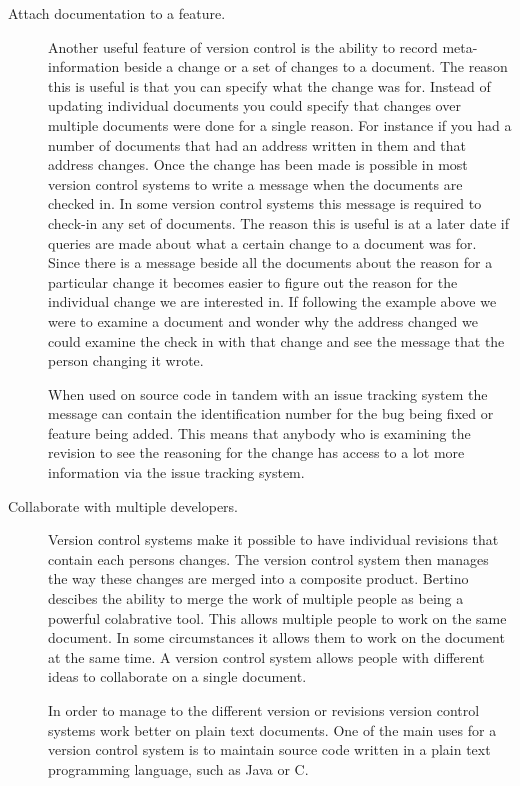 \begin{description}
  \item [Attach documentation to a feature.]    
  Another useful feature of version control is the ability to record meta-information beside a change or a set of changes to a document.  The reason this is useful is that you can specify what the change was for.  Instead of updating individual documents you could specify that changes over multiple documents were done for a single reason.  For instance if you had a number of documents that had an address written in them and that address changes.  Once the change has been made is possible in most version control systems to write a message when the documents are checked in.  In some version control systems this message is required to check-in any set of documents.  The reason this is useful is at a later date if queries are made about what a certain change to a document was for.  Since there is a message beside all the documents about the reason for a particular change it becomes easier to figure out the reason for the individual change we are interested in. If following the example above we were to examine a document and wonder why the address changed we could examine the check in with that change and see the message that the person changing it wrote.

  When used on source code in tandem with an issue tracking system the message can contain the identification number for the bug being fixed or feature being added.  This means that anybody who is examining the revision to see the reasoning for the change has access to a lot more information via the issue tracking system.


  \item [Collaborate with multiple developers.]
  Version control systems make it possible to have individual revisions that contain each persons changes. The version control system then manages the way these changes are merged into a composite product. Bertino \cite{Bertino2012} descibes the ability to merge the work of multiple people as being a powerful colabrative tool. This allows multiple people to work on the same document. In some circumstances it allows them to work on the document at the same time.   A version control system allows people with different ideas to collaborate on a single document.

  In order to manage to the different version or revisions version control systems work better on plain text documents. One of the main uses for a version control system is to maintain source code written in a plain text programming language, such as Java or C.

\end{description}


